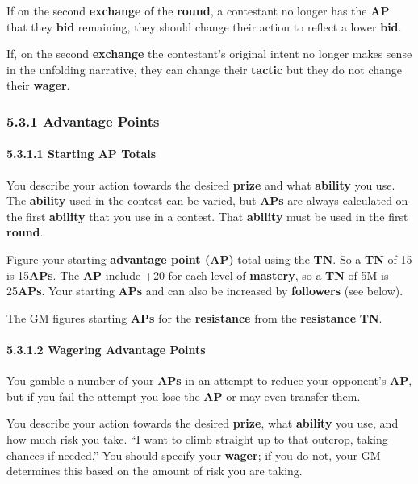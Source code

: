 \documentclass[
  11pt,
]{article}
\begin{document}
If on the second \textbf{exchange} of the \textbf{round}, a contestant
no longer has the \textbf{AP} that they \textbf{bid} remaining, they
should change their action to reflect a lower \textbf{bid}.

If, on the second \textbf{exchange} the contestant's original intent no
longer makes sense in the unfolding narrative, they can change their
\textbf{tactic} but they do not change their \textbf{wager}.

\hypertarget{advantage-points}{%
\subsubsection{5.3.1 Advantage Points}\label{advantage-points}}

\hypertarget{starting-ap-totals}{%
\paragraph{5.3.1.1 Starting AP Totals}\label{starting-ap-totals}}

You describe your action towards the desired \textbf{prize} and what
\textbf{ability} you use. The \textbf{ability} used in the contest can
be varied, but \textbf{APs} are always calculated on the first
\textbf{ability} that you use in a contest. That \textbf{ability} must
be used in the first \textbf{round}.

Figure your starting \textbf{advantage point (AP)} total using the
\textbf{TN}. So a \textbf{TN} of 15 is 15\textbf{APs}. The \textbf{AP}
include +20 for each level of \textbf{mastery}, so a \textbf{TN} of 5M
is 25\textbf{APs}. Your starting \textbf{APs} and can also be increased
by \textbf{followers} (see below).

The GM figures starting \textbf{APs} for the \textbf{resistance} from
the \textbf{resistance} \textbf{TN}.

\hypertarget{wagering-advantage-points}{%
\paragraph{5.3.1.2 Wagering Advantage
Points}\label{wagering-advantage-points}}

You gamble a number of your \textbf{APs} in an attempt to reduce your
opponent's \textbf{AP}, but if you fail the attempt you lose the
\textbf{AP} or may even transfer them.

You describe your action towards the desired \textbf{prize}, what
\textbf{ability} you use, and how much risk you take. ``I want to climb
straight up to that outcrop, taking chances if needed.'' You should
specify your \textbf{wager}; if you do not, your GM determines this
based on the amount of risk you are taking.
\end{document}
